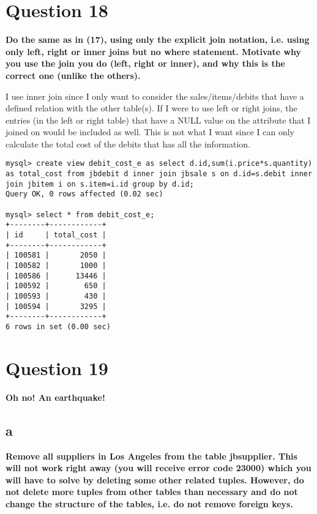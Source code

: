 \documentclass{article}
\begin{document}
\section*{Question 18}
\textbf{Do the same as in (17), using only the explicit join notation, i.e. using only left, right or inner joins but no where statement. Motivate why you use the join you do (left, right or inner), and why this is the correct one (unlike the others).}

I use inner join since I only want to consider the sales/items/debits that have a defined relation with the other table(s). If I were to use left or right joins, the entries (in the left or right table) that have a NULL value on the attribute that I joined on would be included as well. This is not what I want since I can only calculate the total cost of the debits that has all the information.

\begin{lstlisting}
mysql> create view debit_cost_e as select d.id,sum(i.price*s.quantity) as total_cost from jbdebit d inner join jbsale s on d.id=s.debit inner join jbitem i on s.item=i.id group by d.id;
Query OK, 0 rows affected (0.02 sec)

mysql> select * from debit_cost_e;
+--------+------------+
| id     | total_cost |
+--------+------------+
| 100581 |       2050 |
| 100582 |       1000 |
| 100586 |      13446 |
| 100592 |        650 |
| 100593 |        430 |
| 100594 |       3295 |
+--------+------------+
6 rows in set (0.00 sec)
\end{lstlisting}

\pagebreak

\section*{Question 19}
\textbf{Oh no! An earthquake!}
\subsection*{a}
\textbf{Remove all suppliers in Los Angeles from the table jbsupplier. This will not work right away (you will receive error code 23000) which you will have to solve by deleting some other related tuples. However, do not delete more tuples from other tables than necessary and do not change the structure of the tables, i.e. do not remove foreign keys.}
\end{document}
